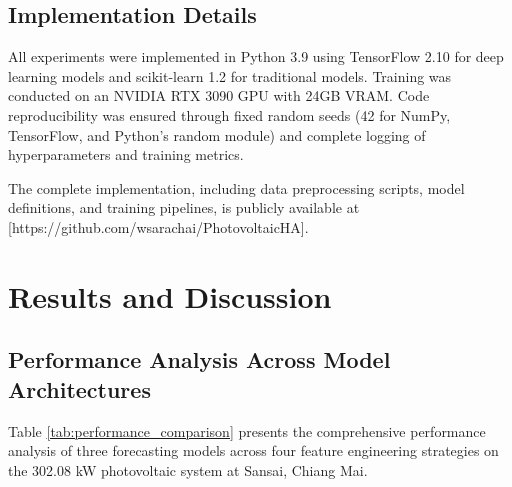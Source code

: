 \documentclass[conference]{IEEEtran}
\begin{document}
\subsection{Implementation Details}
All experiments were implemented in Python 3.9 using TensorFlow 2.10 for deep learning models and scikit-learn 1.2 for traditional models. Training was conducted on an NVIDIA RTX 3090 GPU with 24GB VRAM. Code reproducibility was ensured through fixed random seeds (42 for NumPy, TensorFlow, and Python's random module) and complete logging of hyperparameters and training metrics.

The complete implementation, including data preprocessing scripts, model definitions, and training pipelines, is publicly available at [https://github.com/wsarachai/PhotovoltaicHA].


\section{Results and Discussion}

\subsection{Performance Analysis Across Model Architectures}

Table \ref{tab:performance_comparison} presents the comprehensive performance analysis of three forecasting models across four feature engineering strategies on the 302.08 kW photovoltaic system at Sansai, Chiang Mai.
\end{document}
